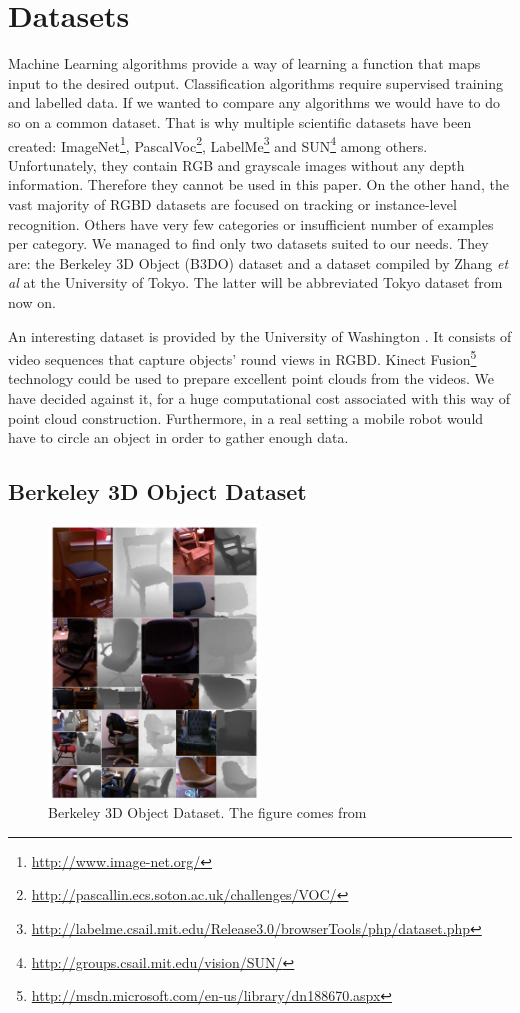 \section{Datasets}

	Machine Learning algorithms provide a way of learning a function that maps input to the desired output. Classification algorithms require supervised training and labelled data. If we wanted to compare any algorithms we would have to do so on a common dataset. That is why multiple scientific datasets have been created: ImageNet\footnote{\url{http://www.image-net.org/}}, PascalVoc\footnote{\url{http://pascallin.ecs.soton.ac.uk/challenges/VOC/}}, LabelMe\footnote{\url{http://labelme.csail.mit.edu/Release3.0/browserTools/php/dataset.php}} and SUN\footnote{\url{http://groups.csail.mit.edu/vision/SUN/}} among others. Unfortunately, they contain RGB and grayscale images without any depth information. Therefore they cannot be used in this paper. On the other hand, the vast majority of RGBD datasets are focused on tracking or instance-level recognition. Others have very few categories or insufficient number of examples per category. We managed to find only two datasets suited to our needs. They are: the Berkeley 3D Object (B3DO) dataset \cite{B3DO} and a dataset compiled by Zhang \emph{et al} at the University of Tokyo\cite{zhangcategory}. The latter will be abbreviated Tokyo dataset from now on. 
	
	An interesting dataset is provided by the University of Washington \cite{dataset_washington}. It consists of video sequences that capture objects' round views in RGBD. Kinect Fusion\footnote{\url{http://msdn.microsoft.com/en-us/library/dn188670.aspx}} technology could be used to prepare excellent point clouds from the videos. We have decided against it, for a huge computational cost associated with this way of point cloud construction. Furthermore, in a real setting a mobile robot would have to circle an object in order to gather enough data.

	\subsection{Berkeley 3D Object Dataset}
	\begin{figure}[!ht]
	\centering
	\includegraphics[width=0.5\textwidth]{../figs/b3do_dataset}
	\caption{Berkeley 3D Object Dataset. The figure comes from \cite{B3DO}}
	\label{fig:b3do}
	\end{figure}
	
